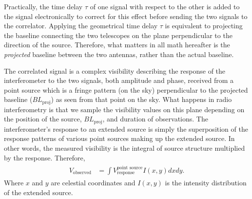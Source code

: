 \documentclass[a4wide,12pt]{book}
\begin{document}
Practically, the time delay $\tau$ of one signal with respect to the other is added to the signal electronically to correct for this effect before sending the two signals to the correlator. Applying the geometrical time delay $\tau$ is equivalent to projecting the baseline connecting the two telescopes on the plane perpendicular to the direction of the source. Therefore, what matters in all math hereafter is the \emph{projected} baseline between the two antennas, rather than the actual baseline. 

The correlated signal is a complex visibility describing the response of the interferometer to the two signals, both amplitude and phase, received from a point source which is a fringe pattern (on the sky) perpendicular to the projected baseline ($BL_\mathrm{proj}$) as seen from that point on the sky. What happens in radio interferometry is that we sample the visibility values on this plane depending on the position of the source, $BL_\mathrm{proj}$, and duration of observations. The interferometer's response to an extended source is simply the superposition of the response patterns of various point sources making up the extended source. In other words, the measured visibility is the integral of source structure multiplied by the response. Therefore,
\begin{align} 
\begin{split}
V_\mathrm{observed} &= \int V^\text{point source}_\text{response} I(x, y) dx dy.
\end{split}                    
\end{align}
Where $x$ and $y$ are celestial coordinates and $I(x, y)$ is the intensity distribution of the extended source.
\end{document}
